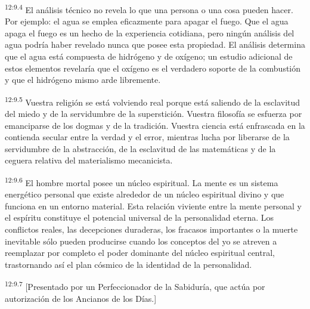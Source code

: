 \par
\textsuperscript{12:9.4} El análisis técnico no revela lo que una persona o una cosa pueden hacer. Por ejemplo: el agua se emplea eficazmente para apagar el fuego. Que el agua apaga el fuego es un hecho de la experiencia cotidiana, pero ningún análisis del agua podría haber revelado nunca que posee esta propiedad. El análisis determina que el agua está compuesta de hidrógeno y de oxígeno; un estudio adicional de estos elementos revelaría que el oxígeno es el verdadero soporte de la combustión y que el hidrógeno mismo arde libremente.

\par
\textsuperscript{12:9.5} Vuestra religión se está volviendo real porque está saliendo de la esclavitud del miedo y de la servidumbre de la superstición. Vuestra filosofía se esfuerza por emanciparse de los dogmas y de la tradición. Vuestra ciencia está enfrascada en la contienda secular entre la verdad y el error, mientras lucha por liberarse de la servidumbre de la abstracción, de la esclavitud de las matemáticas y de la ceguera relativa del materialismo mecanicista.

\par
\textsuperscript{12:9.6} El hombre mortal posee un núcleo espiritual. La mente es un sistema energético personal que existe alrededor de un núcleo espiritual divino y que funciona en un entorno material. Esta relación viviente entre la mente personal y el espíritu constituye el potencial universal de la personalidad eterna. Los conflictos reales, las decepciones duraderas, los fracasos importantes o la muerte inevitable sólo pueden producirse cuando los conceptos del yo se atreven a reemplazar por completo el poder dominante del núcleo espiritual central, trastornando así el plan cósmico de la identidad de la personalidad.

\par
\textsuperscript{12:9.7} [Presentado por un Perfeccionador de la Sabiduría, que actúa por autorización de los Ancianos de los Días.]